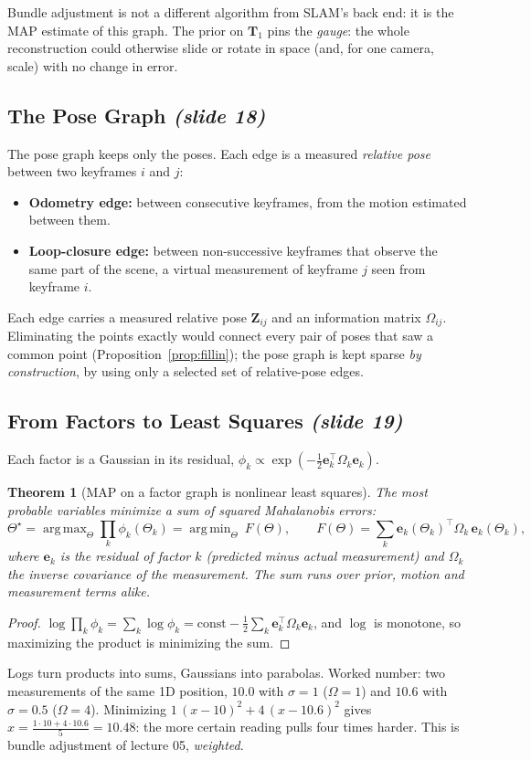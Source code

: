 \documentclass[11pt,a4paper]{article}
\newcommand{\slrs}[1]{\texorpdfstring{\emph{(slide #1)}}{(slide #1)}}
\newcommand{\be}{\mathbf{e}}
\newcommand{\bT}{\mathbf{T}}
\DeclareMathOperator*{\argmin}{arg\,min}
\DeclareMathOperator*{\argmax}{arg\,max}
\theoremstyle{definition}
\theoremstyle{plain}
\newtheorem{theorem}[definition]{Theorem}
\theoremstyle{remark}
\begin{document}
\begin{intuition}
Bundle adjustment is not a different algorithm from SLAM's back end: it is the MAP estimate of this graph. The prior on $\bT_1$ pins the \emph{gauge}: the whole reconstruction could otherwise slide or rotate in space (and, for one camera, scale) with no change in error.
\end{intuition}

\subsection{The Pose Graph \slrs{18}}
The pose graph keeps only the poses. Each edge is a measured \emph{relative pose} between two keyframes $i$ and $j$:
\begin{itemize}[nosep]
\item \textbf{Odometry edge:} between consecutive keyframes, from the motion estimated between them.
\item \textbf{Loop-closure edge:} between non-successive keyframes that observe the same part of the scene, a virtual measurement of keyframe $j$ seen from keyframe $i$.
\end{itemize}
Each edge carries a measured relative pose $\mathbf Z_{ij}$ and an information matrix $\Omega_{ij}$. Eliminating the points exactly would connect every pair of poses that saw a common point (Proposition~\ref{prop:fillin}); the pose graph is kept sparse \emph{by construction}, by using only a selected set of relative-pose edges.

\subsection{From Factors to Least Squares \slrs{19}}
Each factor is a Gaussian in its residual, $\phi_k\propto\exp(-\frac12\be_k^\top\Omega_k\be_k)$.

\begin{theorem}[MAP on a factor graph is nonlinear least squares]\label{thm:map}
The most probable variables minimize a sum of squared Mahalanobis errors:
\[
\Theta^\star=\argmax_\Theta\prod_k\phi_k(\Theta_k)=\argmin_\Theta\ F(\Theta),\qquad F(\Theta)=\sum_k\be_k(\Theta_k)^\top\Omega_k\,\be_k(\Theta_k),
\]
where $\be_k$ is the residual of factor $k$ (predicted minus actual measurement) and $\Omega_k$ the inverse covariance of the measurement. The sum runs over prior, motion and measurement terms alike.
\end{theorem}
\begin{proof}
$\log\prod_k\phi_k=\sum_k\log\phi_k=\text{const}-\tfrac12\sum_k\be_k^\top\Omega_k\be_k$, and $\log$ is monotone, so maximizing the product is minimizing the sum. \qedhere
\end{proof}
\begin{intuition}
Logs turn products into sums, Gaussians into parabolas. Worked number: two measurements of the same 1D position, $10.0$ with $\sigma=1$ ($\Omega=1$) and $10.6$ with $\sigma=0.5$ ($\Omega=4$). Minimizing $1\,(x-10)^2+4\,(x-10.6)^2$ gives $x=\frac{1\cdot10+4\cdot10.6}{5}=10.48$: the more certain reading pulls four times harder. This is bundle adjustment of lecture 05, \emph{weighted}.
\end{intuition}
\end{document}

